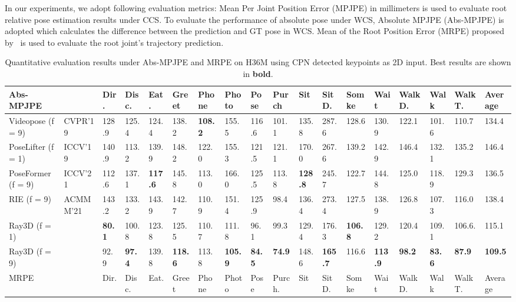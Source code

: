 \documentclass[10pt,twocolumn,letterpaper]{article}
\begin{document}
In our experiments, we adopt following evaluation metrics: Mean Per Joint Position Error (MPJPE) in millimeters is used to evaluate root relative pose estimation results under CCS. To evaluate the performance of absolute pose under WCS, Absolute MPJPE (Abs-MPJPE) is adopted which calculates the difference between the prediction and GT pose in WCS. Mean of the Root Position Error (MRPE) proposed by~\cite{ju2019absposelifter} is used to evaluate the root joint's trajectory prediction.


\begin{table*}[htbp]
\centering
\tiny
\caption{Quantitative evaluation results under Abs-MPJPE and MRPE on H36M using CPN detected keypoints as 2D input. Best results are shown in \textbf{bold}.}
\vskip-12pt
\begin{tabular}{@{}l|llllllllllllllll|l@{}}
\toprule
Abs-MPJPE              &                                   &Dir.  &Disc. &Eat.  &Greet &Phone &Photo &Pose   &Purch   &Sit   &SitD.  &Somke &Wait  &WalkD. &Walk  &WalkT. &Average \\ \midrule
Videopose (f = 9) ~\cite{dario2019videopose} &CVPR'19 &128.9 &125.4 &124.4 &138.2 &\textbf{108.2} &155.5 &116.6  &101.1   &135.8 &287.6  &128.6 &130.9 &122.1  &101.6 &110.7  &134.4  \\
PoseLifter (f = 1)~\cite{ju2019absposelifter}           &ICCV’19 &140.9 &113.2 &139.9 &148.2&122.0  &155.3 &121.5  &121.1   &170.0 &267.6  &139.2 &142.9 &146.4  &132.1 &135.2  &146.4   \\
PoseFormer (f = 9) \cite{ce2021poseformer}        &ICCV'21 &112.6 &137.1 &\textbf{117.6} &145.8 &113.0 &166.0 &125.5  &113.8   &\textbf{128.8} &245.7  &122.7 &144.8 &125.0  &118.9 &129.3  &136.5  \\
RIE (f = 9) ~\cite{wenkang2021improving}          &ACMMM'21 &143.2 &133.2 &143.9 &142.7 &110.9 &151.4 &125.9  &98.4    &136.4 &273.4  &127.5 &138.9 &126.8  &107.3 &116.0  &138.4   \\ \hline
Ray3D (f = 1)                                     &        &\textbf{80.1}  &100.8 &123.8 &125.5 &110.7 &111.8 &96.1   &99.3    &129.4 &176.3  &\textbf{106.8} &129.2 &120.4  &109.1 &106.6. &115.1 \\
Ray3D (f = 9)                                     &        &92.9  &\textbf{97.4}  &139.8 &\textbf{118.6} &113.8 &\textbf{105.9} &\textbf{84.5}   &\textbf{74.9}   &148.6 &\textbf{165.7}  &116.6 &\textbf{113.9} &\textbf{98.2}   &\textbf{83.6}  &\textbf{87.9}  &\textbf{109.5} \\ \bottomrule
MRPE                    &                                  &Dir.  &Disc. &Eat.   &Greet &Phone &Photo &Pose  &Purch.  &Sit   &SitD.  &Somke &Wait  &WalkD. &Walk  &WalkT. &Average \\ \midrule

\end{tabular}
\end{table*}
\end{document}
